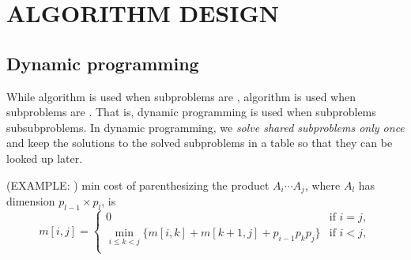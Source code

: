 \section{ALGORITHM DESIGN}
\subsection{Dynamic programming}
\bit
\w While  algorithm is used when subproblems
are ,  algorithm is used when
subproblems are . That is, dynamic programming is used
when subproblems  subsubproblems.
\w In dynamic programming, 
we {\em solve  shared subproblems only once\/} and keep the solutions
to the solved subproblems in a table so that they can be looked up later.

\w (EXAMPLE: ) min cost of parenthesizing the
product $A_i\cdots A_j$, where $A_l$ has dimension $p_{l-1}\times p_l$, is
\[ m[i, j] = \left\{\begin{array}{ll}
   0 & \mbox{if\ } i = j,\\
   \min_{i \le k < j}\{m[i, k] + m[k+1,j] + p_{i-1}p_kp_j\} & \mbox{if\ } i <
   j,\\ 
	    \end{array}\right.\]

\eit

